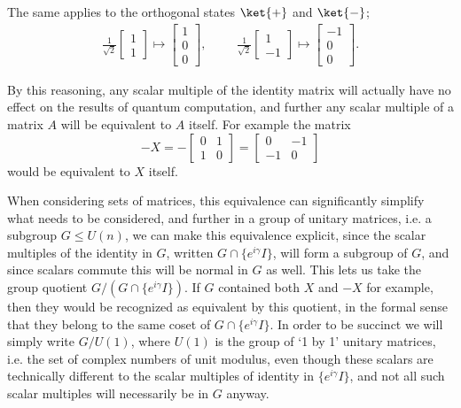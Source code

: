 The same applies to the orthogonal states $\ket{+}$ and $\ket{-}$;
\begin{align*}
	\frac{1}{\sqrt{2}}\begin{bmatrix}1 \\ 1\end{bmatrix} \mapsto \begin{bmatrix}1\\0\\0\end{bmatrix},
	&&&
	\frac{1}{\sqrt{2}}\begin{bmatrix}1 \\ -1\end{bmatrix} \mapsto \begin{bmatrix}-1\\0\\0\end{bmatrix}.
\end{align*}

By this reasoning, any scalar multiple of the identity matrix will actually have no effect on the results of quantum computation, and further any scalar multiple of a matrix $A$ will be equivalent to $A$ itself. For example the matrix
\[-X = -\left[\begin{matrix}0 & 1 \\ 1 & 0\end{matrix}\right]= \left[\begin{matrix}0 & -1 \\ -1 & 0\end{matrix}\right]\]
would be equivalent to $X$ itself.

When considering sets of matrices, this equivalence can significantly simplify what needs to be considered, and further in a group of unitary matrices, i.e. a subgroup $G \leq U(n)$, we can make this equivalence explicit, since the scalar multiples of the identity in $G$, written $G \cap \{e^{i\gamma}I\}$, will form a subgroup of $G$, and since scalars commute this will be normal in $G$ as well. This lets us take the group quotient $G / (G \cap \{e^{i\gamma}I\})$. If $G$ contained both $X$ and $-X$ for example, then they would be recognized as equivalent by this quotient, in the formal sense that they belong to the same coset of $G \cap \{e^{i\gamma}I\}$. In order to be succinct we will simply write $G / U(1)$, where $U(1)$ is the group of `1 by 1' unitary matrices, i.e. the set of complex numbers of unit modulus, even though these scalars are technically different to the scalar multiples of identity in $\{e^{i\gamma}I\}$, and not all such scalar multiples will necessarily be in $G$ anyway.

